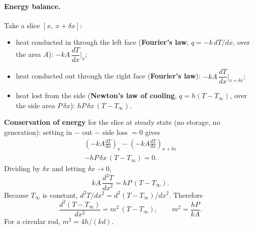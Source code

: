 \documentclass[reprint, amsmath, amssymb, aps, prl]{revtex4-2}
\begin{document}
\paragraph*{Energy balance.}
Take a slice $[x,\ x+\delta x]$:
\begin{itemize}
\item heat conducted in through the left face (\textbf{Fourier's law}, $q=-k\,dT/dx$,
over the area $A$): $-kA\,\dfrac{dT}{dx}\Big|_x$;
\item heat conducted out through the right face (\textbf{Fourier's law}):
$-kA\,\dfrac{dT}{dx}\Big|_{x+\delta x}$;
\item heat lost from the side (\textbf{Newton's law of cooling}, $q=h(T-T_\infty)$, over
the side area $P\,\delta x$): $hP\,\delta x\,(T-T_\infty)$.
\end{itemize}
\textbf{Conservation of energy} for the slice at steady state (no storage, no
generation): setting in $-$ out $-$ side loss $=0$ gives
\begin{multline}
\left(-kA\frac{dT}{dx}\right)_x-\left(-kA\frac{dT}{dx}\right)_{x+\delta x}\\
-hP\,\delta x\,(T-T_\infty)=0.
\tag{4.28}
\end{multline}
Dividing by $\delta x$ and letting $\delta x\to0$,
\begin{equation*}
kA\,\frac{d^2T}{dx^2}=hP\,(T-T_\infty).
\end{equation*}
Because $T_\infty$ is constant, $d^2T/dx^2=d^2(T-T_\infty)/dx^2$. Therefore
\begin{equation}
\frac{d^2(T-T_\infty)}{dx^2}=m^2\,(T-T_\infty),\qquad m^2=\frac{hP}{kA}.
\tag{4.30}
\end{equation}
For a circular rod, $m^2=4h/(kd)$.
\end{document}
